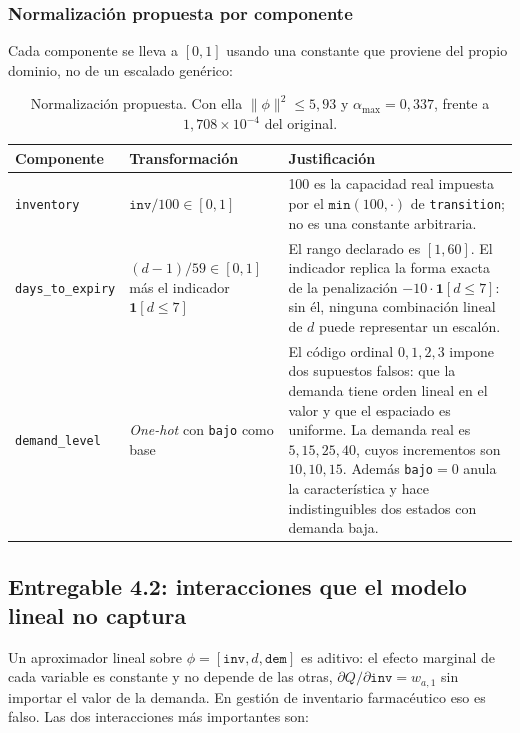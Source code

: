 \documentclass[11pt,letterpaper]{article}
\begin{document}
\subsubsection*{Normalización propuesta por componente}

Cada componente se lleva a $[0,1]$ usando una constante que proviene del propio
dominio, no de un escalado genérico:

\begin{table}[!ht]
\centering
\small
\begin{tabular}{p{3.1cm}p{4.6cm}p{7.2cm}}
\toprule
\textbf{Componente} & \textbf{Transformación} & \textbf{Justificación} \\
\midrule
\texttt{inventory} &
$\texttt{inv}/100 \in [0,1]$ &
100 es la capacidad real impuesta por el $\texttt{min}(100,\cdot)$ de
\texttt{transition}; no es una constante arbitraria. \\
\addlinespace
\texttt{days\_to\_expiry} &
$(d-1)/59 \in [0,1]$ más el indicador $\mathbf{1}[d \le 7]$ &
El rango declarado es $[1,60]$. El indicador replica la forma exacta de la
penalización $-10\cdot\mathbf{1}[d\le 7]$: sin él, ninguna combinación lineal de $d$
puede representar un escalón. \\
\addlinespace
\texttt{demand\_level} &
\emph{One-hot} con \texttt{bajo} como base &
El código ordinal $0,1,2,3$ impone dos supuestos falsos: que la demanda tiene orden
lineal en el valor y que el espaciado es uniforme. La demanda real es
$5,15,25,40$, cuyos incrementos son $10,10,15$. Además \texttt{bajo}$=0$ anula la
característica y hace indistinguibles dos estados con demanda baja. \\
\bottomrule
\end{tabular}
\caption{Normalización propuesta. Con ella $\lVert\phi\rVert^2 \le 5{,}93$ y
$\alpha_{\mathrm{max}} = 0{,}337$, frente a $1{,}708\times10^{-4}$ del original.}
\end{table}

\subsection{Entregable 4.2: interacciones que el modelo lineal no captura}

Un aproximador lineal sobre $\phi = [\texttt{inv}, d, \texttt{dem}]$ es aditivo: el
efecto marginal de cada variable es constante y no depende de las otras,
$\partial Q / \partial \texttt{inv} = w_{a,1}$ sin importar el valor de la demanda.
En gestión de inventario farmacéutico eso es falso. Las dos interacciones más
importantes son:
\end{document}
